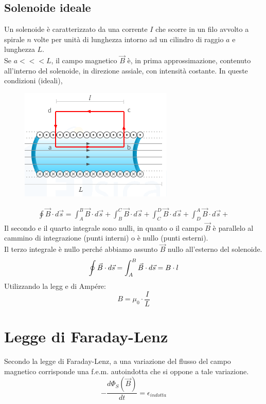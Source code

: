 \subsection{Solenoide ideale}
Un solenoide è caratterizzato da una corrente $I$ che scorre in un filo avvolto a spirale $n$ volte per unità di lunghezza intorno ad un cilindro di raggio $a$ e lunghezza $L$.\\
Se $a <<< L$, il campo magnetico $\vec{B}$ è, in prima approssimazione, contenuto all'interno del solenoide, in direzione assiale, con intensità costante. In queste condizioni (ideali),  
\begin{figure}[h!]
	\centering
	\includegraphics[scale=3]{Pictures/solenoide-ampere.png}
\end{figure}
\begin{displaymath}\begin{aligned}
	\oint \vec{B} \cdot d\vec{s} = \int_A^B \vec{B} \cdot d\vec{s} + \int_B^C \vec{B} \cdot d\vec{s} + \int_C^D \vec{B} \cdot d\vec{s} + \int_D^A \vec{B} \cdot d\vec{s} + 
\end{aligned}\end{displaymath}
Il secondo e il quarto integrale sono nulli, in quanto o il campo $\vec{B}$ è parallelo al cammino di integrazione (punti interni) o è nullo (punti esterni).\\
Il terzo integrale è nullo perché abbiamo assunto $\vec{B}$ nullo all'esterno del solenoide.
\begin{displaymath}
	\oint \vec{B} \cdot d\vec{s} = \int_A^B \vec{B} \cdot d\vec{s} = B \cdot l\\
\end{displaymath}
Utilizzando la legg e di Ampére:
\begin{displaymath}
	B = \mu_0 \cdot \frac{I}{L}
\end{displaymath}

\section{Legge di Faraday-Lenz}
Secondo la legge di Faraday-Lenz, a una variazione del flusso del campo magnetico corrisponde una f.e.m. autoindotta che si oppone a tale variazione.
\begin{displaymath}
	- \frac{d\Phi_S (\vec{B})}{dt} = \epsilon_{indotta}
\end{displaymath}

